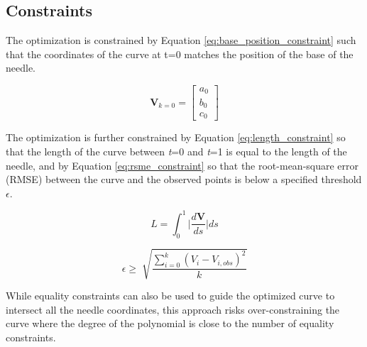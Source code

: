 \subsection{Constraints}
The optimization is constrained by Equation \ref{eq:base_position_constraint} such that the coordinates of the curve at t=0 matches the position of the base of the needle.
 
 \begin{equation}
 \label{eq:base_position_constraint}
 \textbf{V}_{k=0}=\begin{bmatrix} a_0 \\ b_0 \\ c_0 \end{bmatrix}
 \end{equation}

The optimization is further constrained by Equation \ref{eq:length_constraint} so that the length of the curve between \textit{t}=0 and \textit{t}=1 is equal to the length of the needle, and by Equation \ref{eq:rsme_constraint} so that the root-mean-square error (RMSE) between the curve and the observed points is below a specified threshold $\epsilon$.

\begin{equation}
\label{eq:length_constraint}
L = \int_0^1 \lvert\frac{d\textbf{V}}{ds}\rvert ds
\end{equation}

\begin{equation}
\label{eq:rsme_constraint}
\epsilon \geq \sqrt[]{\frac{\sum_{i=0}^{k}(V_i - V_{i, obs})^2}{k}}
\end{equation}

While equality constraints can also be used to guide the optimized curve to intersect all the needle coordinates, this approach risks over-constraining the curve where the degree of the polynomial is close to the number of equality constraints.


